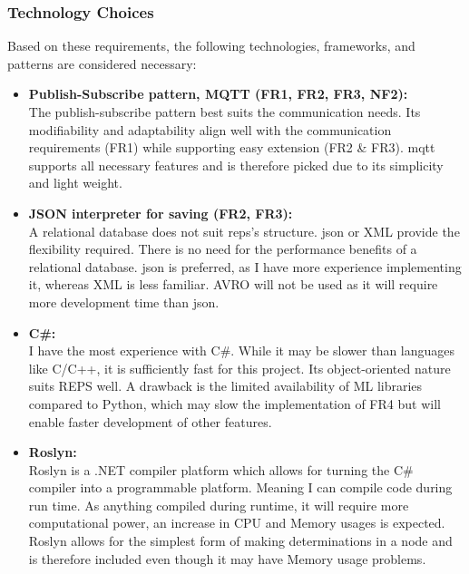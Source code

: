	\subsubsection{Technology Choices}\label{sec:TechChoices}
		Based on these requirements, the following technologies, frameworks, and patterns are considered necessary:
	\begin{itemize}
		\item \textbf{Publish-Subscribe pattern, MQTT (FR1, FR2, FR3, NF2):}\\
		The publish-subscribe pattern best suits the communication needs. Its modifiability and adaptability align well with the communication requirements (FR1) while supporting easy extension (FR2 \& FR3). \gls{mqtt} supports all necessary features and is therefore picked due to its simplicity and light weight.
		
		\item \textbf{JSON interpreter for saving (FR2, FR3):}\\
		A relational database does not suit \gls{reps}’s structure. \gls{json} or XML provide the flexibility required. There is no need for the performance benefits of a relational database. \gls{json} is preferred, as I have more experience implementing it, whereas XML is less familiar. AVRO will not be used as it will require more development time than \gls{json}.
		
		\item \textbf{ C\#:} \\
		I have the most experience with C\#. While it may be slower than languages like C/C++, it is sufficiently fast for this project. Its object-oriented nature suits REPS well. A drawback is the limited availability of ML libraries compared to Python, which may slow the implementation of FR4 but will enable faster development of other features.
		
		\item \textbf{Roslyn:}\\
		Roslyn is a .NET compiler platform which allows for turning the C\# compiler into a programmable platform. Meaning I can compile code during run time. As anything compiled during runtime, it will require more computational power, an increase in CPU and Memory usages is expected. Roslyn allows for the simplest form of making determinations in a node and is therefore included even though it may have Memory usage problems.
		

\end{itemize}
